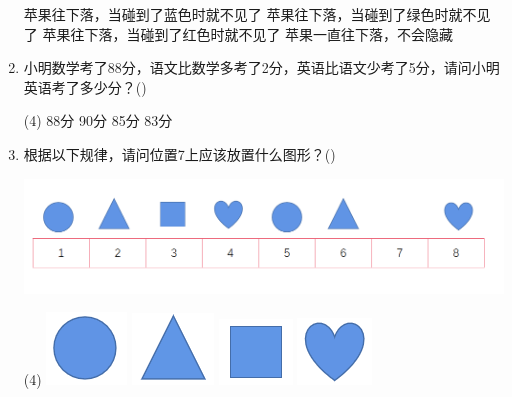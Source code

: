 \documentclass[10pt, a4paper]{article}
\newcommand{\hq}{\hfill(\qquad)}
\begin{document}
\begin{enumerate}
\begin{minipage}{.17\textwidth}
        \end{minipage}
        \begin{minipage}{.5\textwidth}
            \centering
            \begin{tasks}
                \task 苹果往下落，当碰到了蓝色时就不见了
                \task 苹果往下落，当碰到了绿色时就不见了
                \task 苹果往下落，当碰到了红色时就不见了
                \task 苹果一直往下落，不会隐藏
            \end{tasks}
        \end{minipage}

        \newpage
        \item 小明数学考了88分，语文比数学多考了2分，英语比语文少考了5分，请问小明英语考了多少分？\hq
        \begin{tasks}(4)
            \task 88分
            \task 90分
            \task 85分
            \task 83分
        \end{tasks}

        \item 根据以下规律，请问位置7上应该放置什么图形？\hq
        
        \begin{minipage}{.3\textwidth}
            \centering
            \includegraphics[width=\textwidth]{figure/9.png}
        \end{minipage}
        \begin{minipage}{.6\textwidth}
            \begin{tasks}(4)
                \task \includegraphics[width=.05\textwidth]{figure/9a.png}
                \task \includegraphics[width=.05\textwidth]{figure/9b.png}
                \task \includegraphics[width=.05\textwidth]{figure/9c.png}
                \task \includegraphics[width=.05\textwidth]{figure/9d.png}
            \end{tasks}
        \end{minipage}


\end{enumerate}
\end{document}
